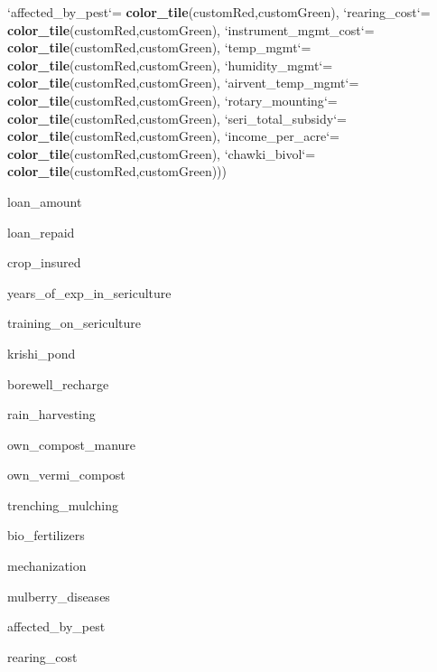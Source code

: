 \documentclass[
]{article}
\newenvironment{Shaded}{\begin{snugshade}}{\end{snugshade}}
\newcommand{\DataTypeTok}[1]{\textcolor[rgb]{0.13,0.29,0.53}{#1}}
\newcommand{\KeywordTok}[1]{\textcolor[rgb]{0.13,0.29,0.53}{\textbf{#1}}}
\newcommand{\NormalTok}[1]{#1}
\newcommand{\StringTok}[1]{\textcolor[rgb]{0.31,0.60,0.02}{#1}}
\begin{document}
\begin{Shaded}
\begin{Highlighting}[]
            \StringTok{`}\DataTypeTok{affected_by_pest}\StringTok{`}\NormalTok{=}\StringTok{ }\KeywordTok{color_tile}\NormalTok{(customRed,customGreen),}
            \StringTok{`}\DataTypeTok{rearing_cost}\StringTok{`}\NormalTok{=}\StringTok{ }\KeywordTok{color_tile}\NormalTok{(customRed,customGreen),}
            \StringTok{`}\DataTypeTok{instrument_mgmt_cost}\StringTok{`}\NormalTok{=}\StringTok{ }\KeywordTok{color_tile}\NormalTok{(customRed,customGreen),}
            \StringTok{`}\DataTypeTok{temp_mgmt}\StringTok{`}\NormalTok{=}\StringTok{ }\KeywordTok{color_tile}\NormalTok{(customRed,customGreen),}
            \StringTok{`}\DataTypeTok{humidity_mgmt}\StringTok{`}\NormalTok{=}\StringTok{ }\KeywordTok{color_tile}\NormalTok{(customRed,customGreen),}
            \StringTok{`}\DataTypeTok{airvent_temp_mgmt}\StringTok{`}\NormalTok{=}\StringTok{ }\KeywordTok{color_tile}\NormalTok{(customRed,customGreen),}
            \StringTok{`}\DataTypeTok{rotary_mounting}\StringTok{`}\NormalTok{=}\StringTok{ }\KeywordTok{color_tile}\NormalTok{(customRed,customGreen),}
            \StringTok{`}\DataTypeTok{seri_total_subsidy}\StringTok{`}\NormalTok{=}\StringTok{ }\KeywordTok{color_tile}\NormalTok{(customRed,customGreen),}
            \StringTok{`}\DataTypeTok{income_per_acre}\StringTok{`}\NormalTok{=}\StringTok{ }\KeywordTok{color_tile}\NormalTok{(customRed,customGreen),}
            \StringTok{`}\DataTypeTok{chawki_bivol}\StringTok{`}\NormalTok{=}\StringTok{ }\KeywordTok{color_tile}\NormalTok{(customRed,customGreen)))}
\end{Highlighting}
\end{Shaded}

loan\_amount

loan\_repaid

crop\_insured

years\_of\_exp\_in\_sericulture

training\_on\_sericulture

krishi\_pond

borewell\_recharge

rain\_harvesting

own\_compost\_manure

own\_vermi\_compost

trenching\_mulching

bio\_fertilizers

mechanization

mulberry\_diseases

affected\_by\_pest

rearing\_cost
\end{document}

